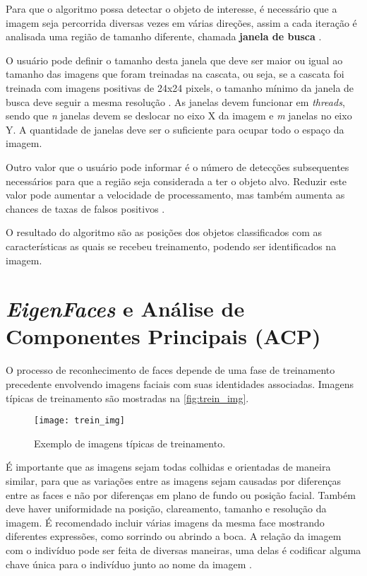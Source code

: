 Para que o algoritmo possa detectar o objeto de interesse, é necessário que a imagem seja percorrida diversas vezes em várias direções, assim a cada iteração é analisada uma região de tamanho diferente, chamada \textbf{janela de busca} \cite{gustavo_cascata}. 

O usuário pode definir o tamanho desta janela que deve ser maior ou igual ao tamanho das imagens que foram treinadas na cascata, ou seja, se a cascata foi treinada com imagens positivas de 24x24 pixels, o tamanho mínimo da janela de busca deve seguir a mesma resolução \cite{gustavo_cascata}. As janelas devem funcionar em \textit{threads}, sendo que \textit{n} janelas devem se deslocar no eixo X da imagem e \textit{m} janelas no eixo Y. A quantidade de janelas deve ser o suficiente para ocupar todo o espaço da imagem.

Outro valor que o usuário pode informar é o número de detecções subsequentes necessários para que a região seja considerada a ter o objeto alvo. Reduzir este valor pode aumentar a velocidade de processamento, mas também aumenta as chances de taxas de falsos positivos \cite{drmathew_java_programming}.

O resultado do algoritmo são as posições dos objetos classificados com as características as quais se recebeu treinamento, podendo ser identificados na imagem.




\section{\textit{EigenFaces} e Análise de Componentes Principais (ACP) }\label{sec:recog_faces}

O processo de reconhecimento de faces depende de uma fase de treinamento precedente envolvendo imagens faciais com suas identidades associadas. Imagens típicas de treinamento são mostradas na \autoref{fig:trein_img}.
\begin{figure}[h]
	\centering
	\texttt{[image: trein\_img]}
	\caption{Exemplo de imagens típicas de treinamento.}
	\label{fig:trein_img}
\end{figure}

É importante que as imagens sejam todas colhidas e orientadas de maneira similar, para que as variações entre as imagens sejam causadas por diferenças entre as faces e não por diferenças  em plano de fundo ou posição facial. Também deve haver uniformidade na posição, clareamento, tamanho e resolução da imagem. É recomendado incluir várias imagens da mesma face mostrando diferentes expressões, como sorrindo ou abrindo a boca. A relação da imagem com o indivíduo pode ser feita de diversas maneiras, uma delas é codificar alguma chave única para o indivíduo junto ao nome da imagem \cite{drmathew_java_programming}. 

